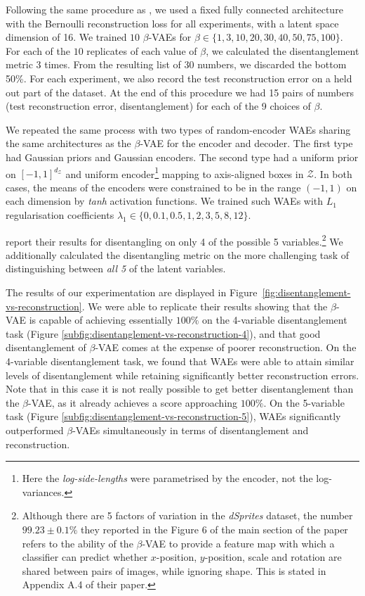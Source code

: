 \documentclass{article}
\def\dZ{d_{\mathcal{Z}}}
\def\Z{\mathcal{Z}}
\begin{document}
Following the same procedure as \citet{HM+17}, we used a fixed fully connected architecture with the Bernoulli reconstruction loss for all experiments, with a latent space dimension of 16. We trained $10$ $\beta$-VAEs for $\beta\in\{1, 3, 10, 20, 30, 40, 50 ,75, 100\}$. For each of the $10$ replicates of each value of $\beta$, we calculated the disentanglement metric $3$ times. From the resulting list of $30$ numbers, we discarded the bottom 50\%. For each experiment, we also record the test reconstruction error on a held out part of the dataset. At the end of this procedure we had 15 pairs of numbers (test reconstruction error, disentanglement) for each of the 9 choices of $\beta$. 

We repeated the same process with two types of random-encoder WAEs sharing the same architectures as the $\beta$-VAE for the encoder and decoder. The first type had Gaussian priors and Gaussian encoders. The second type had a uniform prior on $[-1,1]^{\dZ}$ and uniform encoder\footnote{Here the \emph{log-side-lengths} were parametrised by the encoder, not the log-variances.} mapping to axis-aligned boxes in $\Z$.
In both cases, the means of the encoders were constrained to be in the range $(-1,1)$ on each dimension by \emph{tanh} activation functions.
We trained such WAEs with $L_1$ regularisation coefficients $\lambda_1 \in \{0, 0.1, 0.5, 1, 2, 3, 5, 8, 12\}$.

\citet{HM+17} report their results for disentangling on only 4 of the possible 5 variables.\footnote{Although there are 5 factors of variation in the \emph{dSprites} dataset, the number $99.23\pm0.1\%$ they reported in the Figure 6 of the main section of the paper refers to the ability of the $\beta$-VAE to provide a feature map with which a classifier can predict whether $x$-position, $y$-position, scale and rotation are shared between pairs of images, while ignoring shape. This is stated in Appendix A.4 of their paper.} We additionally calculated the disentangling metric on the more challenging task of distinguishing between \emph{all 5} of the latent variables.

The results of our experimentation are displayed in Figure~\ref{fig:disentanglement-vs-reconstruction}.
We were able to replicate their results showing that the $\beta$-VAE is capable of achieving essentially $100\%$ on the 4-variable disentanglement task (Figure \ref{subfig:disentanglement-vs-reconstruction-4}), and that good disentanglement of $\beta$-VAE comes at the expense of poorer reconstruction. 
On the 4-variable disentanglement task, we found that WAEs were able to attain similar levels of disentanglement while retaining significantly better reconstruction errors. Note that in this case it is not really possible to get better disentanglement than the $\beta$-VAE, as it already achieves a score approaching $100\%$.
On the 5-variable task (Figure \ref{subfig:disentanglement-vs-reconstruction-5}), WAEs significantly outperformed $\beta$-VAEs simultaneously in terms of disentanglement and reconstruction.
\end{document}
